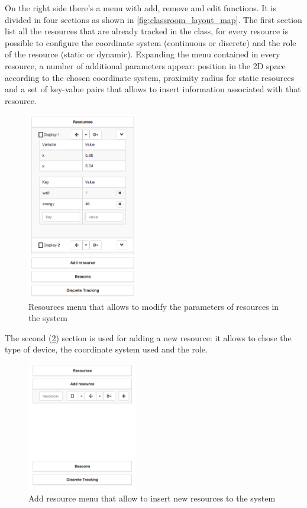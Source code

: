 On the right side there's a menu with add, remove and edit functions. It is divided in four sections as shown in \ref{fig:classroom_layout_map}. The first section list all the resources that are already tracked in the class, for every resource is possible to configure the coordinate system (continuous or discrete) and the role of the resource (static or dynamic). Expanding the menu contained in every resource, a number of additional parameters appear: position in the 2D space according to the chosen coordinate system, proximity radius for static resources and a set of key-value pairs that allows to insert information associated with that resource.

\begin{figure}
\centering
\includegraphics[width=1.9in]{images/classroom-layout-resources.png}
\caption{Resources menu that allows to modify the parameters of resources in the system}
\label{fig:classroom_layout_resources}
\end{figure}

The second (\ref{fig:classroom_layout_add}) section is used for adding a new resource: it allows to chose the type of device, the coordinate system used and the role. 

\begin{figure}
\centering
\includegraphics[width=1.9in]{images/classroom-layout-add-resource.png}
\caption{Add resource menu that allow to insert new resources to the system}
\label{fig:classroom_layout_add}
\end{figure}

